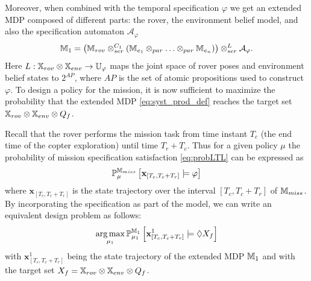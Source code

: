 \documentclass[conference]{IEEEtran}
\begin{document}
Moreover, when combined with the temporal specification $\varphi$ we get an extended MDP composed of different parts: the rover, the environment belief model, and also the specification automaton $\mathcal A_\varphi$
 \begin{equation}
\label{eq:syst_prod_def}
	\MDP_1 = \left( \MDP_{rov} \otimes_{ser}^{C_1} \left( \MDP_{e_1} \otimes_{par} \ldots \otimes_{par} \MDP_{e_n} \right) \right) \otimes_{ser}^{L} \mathcal A_{\varphi}.
\end{equation}
Here $L : \mathbb{X}_{rov} \otimes \mathbb{X}_{env} \rightarrow \mathbb{U}_{\varphi}$ maps the joint space of rover poses and environment belief states to $2^{AP}$, where $AP$ is the set of atomic propositions used to construct $\varphi$. To design a policy for the mission, it is now sufficient to maximize the probability that the extended MDP \eqref{eq:syst_prod_def} reaches the target set $\mathbb{X}_{rov} \otimes \mathbb{X}_{env} \otimes Q_f$.

Recall that the rover performs the mission task from time instant $T_c$ (the end time of the copter exploration) until time $T_r + T_c$. Thus for a given  policy $\mu$ the probability of mission specification satisfaction \eqref{eq:probLTL} can be expressed as
\begin{equation}
\begin{aligned}
	\mathbb{P}_\mu^{\mathbb{M}_{miss}} \left[ \mathbf{x}_{[T_c,T_c+T_r]} \models \varphi \right]
\end{aligned}
\end{equation}
where $\mathbf{x}_{[T_c,T_c+T_r]}$ is the state trajectory over the interval $[T_c,T_c+T_r]$ of $\mathbb{M}_{miss}$. By incorporating the specification as part of the model, we can write an equivalent design problem as follows:
\begin{equation}
  \label{eq:ev_target}
  \argmax_{\mu_1} \mathbb{P}_{\mu_1}^{\MDP_1} \left[ \mathbf{x}_{[T_c,T_c+T_r]}^1 \models \lozenge X_f \right]
\end{equation}
with $\mathbf{x}_{[T_c,T_c+T_r]}^1$ being the state trajectory of the extended MDP $\mathbb{M}_1$ and with the target set $X_f=\mathbb{X}_{rov} \otimes \mathbb{X}_{env} \otimes Q_f$.
\end{document}
